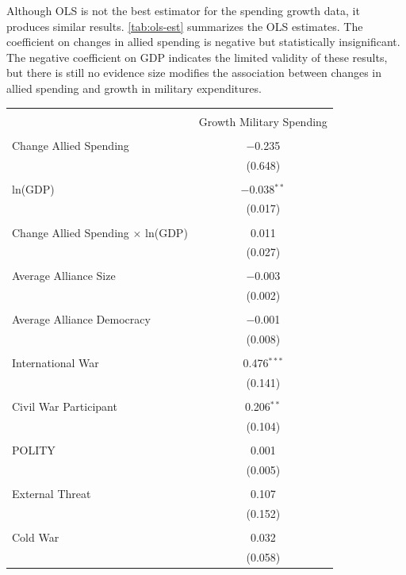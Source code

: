 \documentclass[12pt]{article}
\begin{document}
Although OLS is not the best estimator for the spending growth data, it produces similar results.
\autoref{tab:ols-est} summarizes the OLS estimates. 
The coefficient on changes in allied spending is negative but statistically insignificant. 
The negative coefficient on GDP indicates the limited validity of these results, but there is still no evidence size modifies the association between changes in allied spending and growth in military expenditures. 

\begin{table}[!htbp] \centering 
\begin{tabular}{@{\extracolsep{5pt}}lc} 
\\[-1.8ex]\hline 
\hline \\[-1.8ex] 
 & Growth Military Spending \\ 
\hline \\[-1.8ex] 
 Change Allied Spending & $-$0.235 \\ 
  & (0.648) \\ 
  & \\ 
 ln(GDP) & $-$0.038$^{**}$ \\ 
  & (0.017) \\ 
  & \\ 
 Change Allied Spending $\times$ ln(GDP) & 0.011 \\ 
  & (0.027) \\ 
  & \\ 
 Average Alliance Size & $-$0.003 \\ 
  & (0.002) \\ 
  & \\ 
 Average Alliance Democracy & $-$0.001 \\ 
  & (0.008) \\ 
  & \\ 
 International War & 0.476$^{***}$ \\ 
  & (0.141) \\ 
  & \\ 
 Civil War Participant & 0.206$^{**}$ \\ 
  & (0.104) \\ 
  & \\ 
 POLITY & 0.001 \\ 
  & (0.005) \\ 
  & \\ 
 External Threat & 0.107 \\ 
  & (0.152) \\ 
  & \\ 
 Cold War & 0.032 \\ 
  & (0.058) \\ 

\end{tabular}
\end{table}
\end{document}
